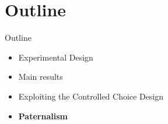 \documentclass[8pt]{beamer}
\begin{document}
\section{Outline}
\begin{frame}{Outline}
     \begin{itemize}
         \vfill\item Experimental Design
         \vfill\item Main results
          \vfill\item Exploiting the Controlled Choice Design
         \vfill\item \textbf{Paternalism}
     \end{itemize}
\end{frame}
\end{document}
